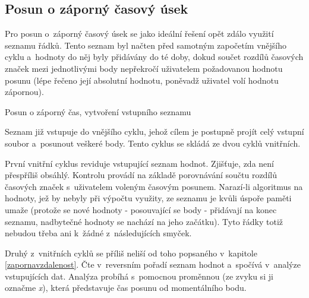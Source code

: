 \subsection{Posun o záporný časový úsek}
\label{zapornycas}

Pro posun o~záporný časový úsek se jako ideální řešení opět zdálo využití seznamu řádků.
Tento seznam byl načten před samotným započetím vnějšího cyklu a~hodnoty do něj byly
přidávány do té doby, dokud součet rozdílů časových značek mezi jednotlivými body
nepřekročí uživatelem požadovanou hodnotu posunu (lépe řečeno její absolutní hodnotu,
poněvadž uživatel volí hodnotu zápornou). 

\begin{algorithm}
    \caption{Posun o záporný čas, vytvoření vstupního seznamu}
    \label{fig:pseudozapornycas-vstup}
    \begin{algorithmic}[1]
    \ENDWHILE
    \end{algorithmic}
\end{algorithm}

Seznam již vstupuje do vnějšího cyklu, jehož cílem je postupně projít celý vstupní
soubor a~posunout veškeré body. Tento cyklus se skládá ze dvou cyklů vnitřních. 

První vnitřní cyklus reviduje vstupující seznam hodnot. Zjišťuje, zda není přes\-příliš obsáhlý.
Kontrolu provádí na základě porovnávání součtu rozdílů časových značek s~uživatelem
voleným časovým posunem. Narazí-li algoritmus na hodnoty, jež by nebyly při výpočtu využity,
ze seznamu je kvůli úspoře paměti umaže (protože se nové hodnoty - posouvající se body - přidávají
na konec seznamu, nadbytečné hodnoty se nachází na jeho začátku). Tyto řádky totiž nebudou
třeba ani k~žádné z~následujících smyček. 

Druhý z~vnitřních cyklů se příliš neliší od toho popsaného v~kapitole \ref{zapornavzdalenost}.
Čte v~reversním pořadí seznam hodnot a~spočívá v~analýze vstupujících dat. Analýza
probíhá s~pomocnou proměnnou (ze zvyku si ji označme
\textit{x}), která představuje čas posunu od momentálního bodu. 

